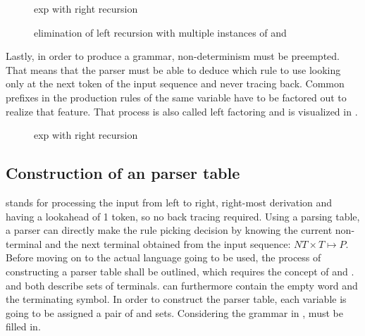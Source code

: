 \begin{figure}
	\centering
	
	

	\caption{exp with right recursion}
	\label{fig:grammar_expRR}
\end{figure}

\begin{figure}
	\centering
	
	

	\caption{elimination of left recursion with multiple instances of \textalpha{} and \textbeta{}}
	\label{fig:grammar_elimLRMultiple}
\end{figure}

\FloatBarrier

Lastly, in order to produce a \textlang{} grammar, non-determinism must be preempted. That means that the parser must be able to deduce which rule to use looking only at the next token of the input sequence and never tracing back. Common prefixes in the production rules of the same variable have to be factored out to realize that feature. That process is also called left factoring and is visualized in .

\begin{figure}
	\centering

	
	
	\caption{exp with right recursion}
	\label{fig:grammar_expLeftFactoring}
\end{figure}

\subsection{Construction of an \textlang{} parser table}

\textlang{} stands for processing the input from left to right, right-most derivation and having a lookahead of 1 token, so no back tracing required. Using a parsing table, a \textlang{} parser can directly make the rule picking decision by knowing the current non-terminal and the next terminal obtained from the input sequence: $NT \times T \mapsto P$. Before moving on to the actual language going to be used, the process of constructing a \textlang{} parser table shall be outlined, which requires the concept of  and .  and  both describe sets of terminals.  can furthermore contain the empty word and  the terminating symbol. In order to construct the parser table, each variable is going to be assigned a pair of  and  sets. Considering the grammar in ,  must be filled in.

